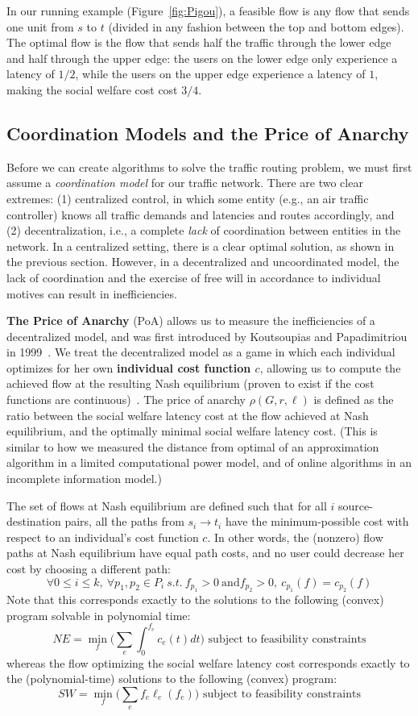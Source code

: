 In our running example (Figure~\ref{fig:Pigou}), a feasible flow is any flow that sends one unit from $s$ to $t$ (divided in any fashion between the top and bottom edges).
The optimal flow is the flow that sends half the traffic through the lower edge and half through the upper edge: the users on the lower edge only experience a latency of $1/2$, while the users on the upper edge experience a latency of $1$, making the social welfare cost cost $3/4$.

\subsection{Coordination Models and the Price of Anarchy}
Before we can create algorithms to solve the traffic routing problem, we must first assume a \emph{coordination model} for our traffic network.
There are two clear extremes: (1) centralized control, in which some entity (e.g., an air traffic controller) knows all traffic demands and latencies and routes accordingly, and
(2) decentralization, i.e., a complete \emph{lack} of coordination between
entities in the network.
In a centralized setting, there is a clear optimal solution, as shown in the previous section.
However, in a decentralized and uncoordinated model, the lack of coordination and the exercise of free will in accordance to individual motives can result in
inefficiencies. 

\medskip
\textbf{The Price of Anarchy} (PoA) allows us to measure the inefficiencies of a decentralized model, and was first introduced by Koutsoupias and Papadimitriou in 1999~\cite{poa}. 
We treat the decentralized model as a game in which each individual optimizes for her own \textbf{individual cost function $c$}, allowing us to compute the achieved flow at the resulting Nash equilibrium (proven to exist if the cost functions are continuous)~\cite{wardrop,haurie,beckmann1956studies}.
The price of anarchy $\rho(G,r,\ell)$ is defined as the ratio between the social welfare latency cost at the flow achieved at Nash equilibrium, and the optimally minimal social welfare latency cost.
(This is similar to how we measured the distance from optimal of an approximation algorithm in a limited computational power model, and of online algorithms in an incomplete information model.)

The set of flows at Nash equilibrium are defined such that for all $i$ source-destination pairs, all the paths from $s_i \to t_i$ have the minimum-possible cost with respect to an individual's cost function $c$. In other words, the (nonzero) flow paths at Nash equilibrium have equal path costs, and no user could decrease her cost by choosing a different path:
$$\forall 0\le i \le k,~\forall p_1, p_2\in P_i~s.t.~f_{p_1} > 0~\text{and} f_{p_2} > 0,~ c_{p_1}(f) = c_{p_2}(f)$$
Note that this corresponds exactly to the solutions to the following (convex) program solvable in polynomial time:
$$NE = \min_f\Big(\sum_e \int_0^{f_e} c_e(t)dt\Big) \text{ subject to feasibility constraints}$$
whereas the flow optimizing the social welfare latency cost corresponds exactly to the (polynomial-time) solutions to the following (convex) program: 
$$SW = \min_f\Big(\sum_e f_e\ell_e(f_e)\Big) \text{ subject to feasibility constraints}$$

